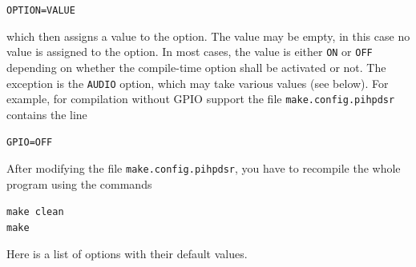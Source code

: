 \documentclass[12pt]{book}
\def\grtt#1{\texttt{\color{magenta}#1}}
\begin{document}
\texttt{OPTION=VALUE}

which then assigns a value to the option. The value may be empty, in this case no value is assigned
to the option. In most cases, the value is either \texttt{ON} or \texttt{OFF} depending on whether
the compile-time option shall be activated or not.
The exception is the \texttt{AUDIO} option, which may take various values
(see below). For example, for compilation without GPIO support the file \grtt{make.config.pihpdsr}
contains the line

\texttt{GPIO=OFF}

After modifying the file \grtt{make.config.pihpdsr}, you have to recompile the
whole program using the commands


\grtt{make clean} \\
\grtt{make}


Here is a list of options with their default values.
\end{document}
